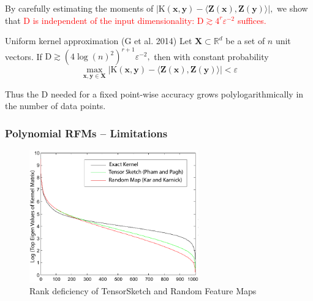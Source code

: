 \documentclass[xcolor=x11names,compress,ignorenonframetext,10pt]{beamer}
\renewcommand{\(}{\begin{columns}}
\renewcommand{\)}{\end{columns}}
\newcommand{\<}[1]{\begin{column}{#1}}
\renewcommand{\>}{\end{column}}
\def\refcolor{DodgerBlue4}
\newcommand{\refer}[1]{({\color{\refcolor}#1})}
\begin{document}
\begin{frame}

By carefully estimating the moments of $|\mathrm{K}(\mathbf{x}, \mathbf{y}) - \langle \mathbf{Z}(\mathbf{x}), \mathbf{Z}(\mathbf{y})\rangle|,$
we show that \textcolor{red}{$\mathrm{D}$ is independent of the input dimensionality:  $\mathrm{D} \gtrsim 4^r \varepsilon^{-2}$  suffices.}

\begin{block}{Uniform kernel approximation \refer{G et al. 2014}}
Let $\mathbf{X} \subset \mathbb{R}^d$ be a set of $n$ unit vectors. If $\mathrm{D} \gtrsim (4 \log(n)^2 )^{r+1} \varepsilon^{-2},$ then with constant probability
$$\max_{\mathbf{x}, \mathbf{y} \in \mathbf{X}} |\mathrm{K}(\mathbf{x}, \mathbf{y}) - \langle \mathbf{Z}(\mathbf{x}), \mathbf{Z}(\mathbf{y})\rangle| < \varepsilon$$
\end{block}

Thus the $\mathrm{D}$ needed for a fixed point-wise accuracy grows polylogarithmically in the number of data points.

\end{frame}

% 
\begin{frame}
\frametitle{Polynomial RFMs -- Limitations}
\begin{figure}[b]
\centering
\includegraphics[width=0.65\textwidth]{figures/craftmaps/rank_def}
\\Rank deficiency of TensorSketch and Random Feature Maps
\end{figure}
\end{frame}
\end{document}
